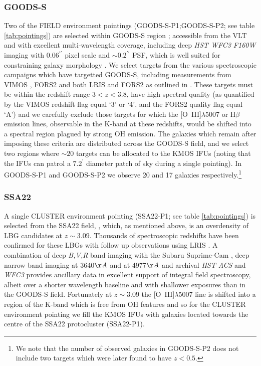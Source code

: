 \documentclass[fleqn,usenatbib]{mn2e}
\begin{document}
\subsubsection{GOODS-S}\label{subsubsec:sample_selection_goods}
Two of the FIELD environment pointings (GOODS-S-P1;GOODS-S-P2; see table \ref{tab:pointings}) are selected within GOODS-S region \citep{Guo2013}; accessible from the VLT and with excellent multi-wavelength coverage, including deep {\em HST WFC3 F160W} imaging with $ 0.06^{\prime\prime}$ pixel scale and $ \sim 0.2^{\prime\prime}$ PSF, which is well suited for constraining galaxy morphology \citep{Grogin2011,Koekemoer2011}.
We select targets from the various spectroscopic campaigns which have targetted GOODS-S, including measurements from VIMOS \citep{Balestra2010,Cassata2014}, FORS2 \citep{Vanzella2005,Vanzella2006,Vanzella2008} and both LRIS and FORS2 as outlined in \cite{Wuyts2009}.
These targets must be within the redshift range $3 < z < 3.8$, have high spectral quality (as quantified by the VIMOS redshift flag equal `3' or `4', and the FORS2 quality flag equal `A') and we carefully exclude those targets for which the [O~{\sc III}]$\lambda$5007 or H$\beta$ emission lines, observable in the K-band at these redshifts, would be shifted into a spectral region plagued by strong OH emission.
The galaxies which remain after imposing these criteria are distributed across the GOODS-S field, and we select two regions where $\sim 20$ targets can be allocated to the KMOS IFUs (noting that the IFUs can patrol a $7.2^{\prime}$ diameter patch of sky during a single pointing).
In GOODS-S-P1 and GOODS-S-P2 we observe 20 and 17 galaxies respectively.\footnote{We note that the number of observed galaxies in GOODS-S-P2 does not include two targets which were later found to have $z < 0.5$.}

\subsubsection{SSA22}\label{subsubsec:sample_selection_ssa}
A single CLUSTER environment pointing (SSA22-P1; see table \ref{tab:pointings}) is selected from the SSA22 field, \citep{Steidel1998,Steidel2000,Steidel2003,Shapley2003}, which, as mentioned above, is an overdensity of LBG candidates at $z \sim 3.09$.
Thousands of spectroscopic redshifts have been confirmed for these LBGs with follow up observations using LRIS \citep{Shapley2003,Nestor2013}.
A combination of deep {\em B,V,R} band imaging with the Subaru Suprime-Cam \citep{Matsuda2004}, deep narrow band imaging at 3640$\AA$ \citep{Matsuda2004} and at 4977$\AA$ \citep{Nestor2011} and archival {\em HST ACS} and {\it WFC3} provides ancillary data in excellent support of integral field spectroscopy, albeit over a shorter wavelength baseline and with shallower exposures than in the GOODS-S field.
Fortunately at $z \sim 3.09$ the [O~{\sc III}]$\lambda$5007 line is shifted into a region of the K-band which is free from OH features and so for the CLUSTER environment pointing we fill the KMOS IFUs with galaxies located towards the centre of the SSA22 protocluster (SSA22-P1).
\end{document}
